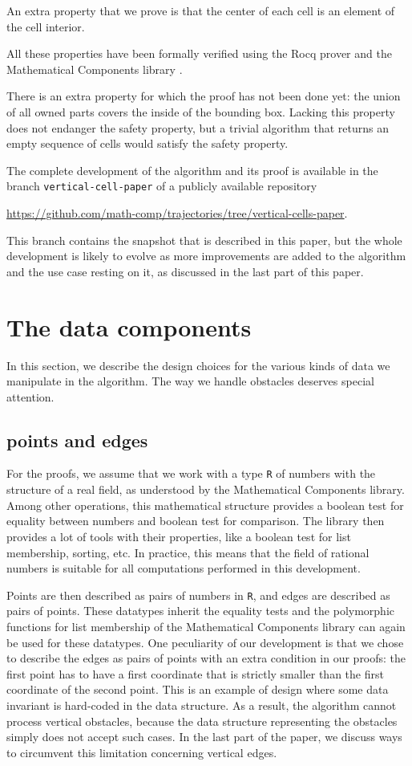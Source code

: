 \documentclass[a4paper, USenglish, cleveref, autoref, thm-restate, final]{lipics-v2021}
\begin{document}
An extra property that we prove is that the center of each cell is an
element of the cell interior.

All these properties have been formally verified using the
Rocq prover and the {\sc Mathematical Components} library
\cite{assia_mahboubi_2022_7118596}.

There is an extra property for which the proof has not been done yet:
the union of all owned parts covers the inside of the bounding box.  Lacking
this property does not endanger the safety property, but a trivial algorithm
that returns an empty sequence of cells would satisfy the safety property.

The complete development of the algorithm and its proof is available
in the branch {\tt vertical-cell-paper} of a publicly
available repository
\begin{center}
\url{https://github.com/math-comp/trajectories/tree/vertical-cells-paper}.
\end{center}
This branch contains the snapshot that is described in this paper, but
the whole development is likely to evolve as more improvements are
added to the algorithm and the use case resting on it, as discussed in the
last part of this paper.

\section{The data components}
In this section, we describe the design choices for the various kinds
of data we manipulate in the algorithm.  The way we handle obstacles
deserves special attention.
\subsection{points and edges}

For the proofs, we assume that we work with a type {\tt R} of numbers
with the structure of a real field, as understood by the
{\sc Mathematical Components} library.  Among other operations, this
mathematical structure provides a boolean test for equality between
numbers and boolean test for comparison.  The library then provides a
lot of tools with their properties, like a boolean test for list
membership, sorting, etc.  In practice, this means that
the field of rational numbers is suitable for all computations
performed in this development.

Points are then described as pairs of numbers in {\tt R}, and edges
are described as pairs of points.  These datatypes inherit the
equality tests and the polymorphic functions for list membership of
the {\sc Mathematical Components} library can again be used for these
datatypes.  One peculiarity of our development
is that we chose to describe the edges as pairs of points with an extra
condition in our proofs: the first point has to have a first
coordinate that is strictly smaller than the first coordinate of the
second point.  This is an example of design where some data invariant
is hard-coded in the data structure.  As a result, the algorithm
cannot process vertical obstacles, because the data structure
representing the obstacles simply does not accept such cases.  In the
last part of the paper, we discuss ways to circumvent this limitation
concerning vertical edges.
\end{document}
